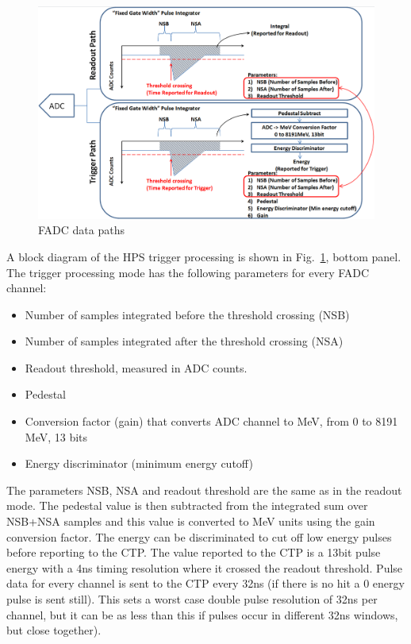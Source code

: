  

\begin{figure}[t]
\includegraphics[scale=0.4]{daq_trigger/figures/hps_trigger_data}
\caption{\small{FADC data paths}}
\label{fig:hps_trigger_data}
\end{figure}

A block diagram of the HPS  trigger processing is shown in Fig.~\ref{fig:hps_trigger_data}, bottom panel. 
The trigger processing mode has the following parameters for every FADC channel:
 \begin{itemize}
 \item Number of samples integrated before the threshold crossing (NSB)
 \item Number of samples integrated after the  threshold crossing (NSA)
 \item Readout threshold, measured in ADC counts.
 \item Pedestal
 \item Conversion factor (gain) that converts  ADC channel to MeV, from 0 to 8191 MeV, 13 bits
 \item Energy discriminator (minimum energy cutoff)
 \end{itemize}
The parameters NSB, NSA and readout threshold are the same as in the readout mode.
The pedestal value is then subtracted from the integrated sum over NSB+NSA samples and this value is converted to MeV units using the gain conversion factor. The energy can be discriminated to cut off low energy pulses before reporting to the CTP. The value reported to the CTP is a 13bit pulse energy with a 4ns timing resolution where it crossed the readout threshold. Pulse data for every channel is sent to the CTP every 32ns (if there is no hit a 0 energy pulse is sent still). This sets a worst case double pulse resolution of 32ns per channel, but it can be as less than this if pulses occur in different 32ns windows, but close together).





